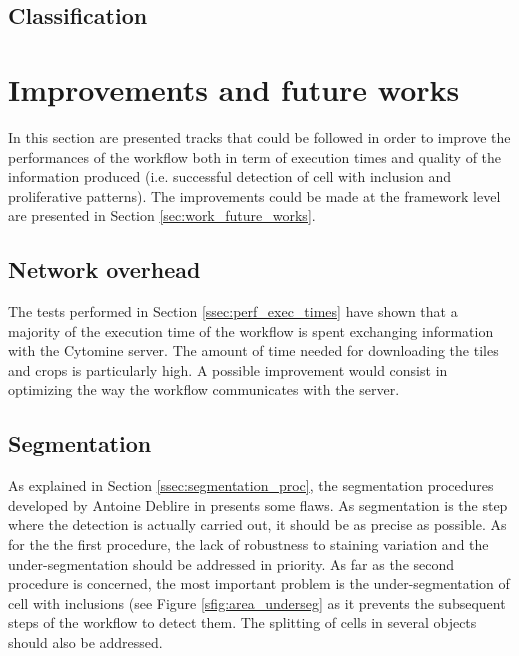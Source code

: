 \begin{figure}
{	}
	\caption{}
	\label{fig:failing_detection}
\end{figure}

\subsection{Classification}

\section{Improvements and future works}

In this section are presented tracks that could be followed in order to improve the performances of the workflow both in term of execution times and quality of the information produced (i.e. successful detection of cell with inclusion and proliferative patterns). The improvements could be made at the framework level are presented in Section \ref{sec:work_future_works}.

\subsection{Network overhead}
The tests performed in Section \ref{ssec:perf_exec_times} have shown that a majority of the execution time of the workflow is spent exchanging information with the Cytomine server. The amount of time needed for downloading the tiles and crops is particularly high. A possible improvement would consist in optimizing the way the workflow communicates with the server. 

\subsection{Segmentation}
As explained in Section \ref{ssec:segmentation_proc}, the segmentation procedures developed by Antoine Deblire in \cite{adeblire2013} presents some flaws. As segmentation is the step where the detection is actually carried out, it should be as precise as possible. As for the the first procedure, the lack of robustness to staining variation and the under-segmentation should be addressed in priority. As far as the second procedure is concerned, the most important problem is the under-segmentation of cell with inclusions (see Figure \ref{sfig:area_underseg} as it prevents the subsequent steps of the workflow to detect them. The splitting of cells in several objects should also be addressed. 

